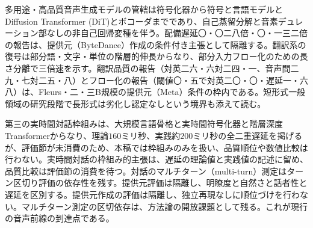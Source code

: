 \documentclass[lualatex,a4paper,10pt]{jlreq}
\begin{document}
多用途・高品質音声生成モデルの管轄は符号化器から符号と言語モデルとDiffusion Transformer (DiT)とボコーダまでであり、自己蒸留分解と音素デュレーション部なしの非自己回帰変種を伴う\autocite{btd061}。配備遅延〇・〇二八倍・〇・一三二倍の報告は、提供元（ByteDance）作成の条件付き主張として隔離する\autocite{btd061}。翻訳系の復号は部分語・文字・単位の階層的伸長からなり、部分入力フロー化のための長さ分離で三倍速を示す\autocite{btd062}。翻訳品質の報告（対英二六・六対二四・一、音声間二九・七対二五・八）とフロー化の報告（閾値〇・五で対英二〇・〇・遅延一・六八）は、Fleurs・二・三B規模の提供元（Meta）条件の枠内である\autocite{btd062}。短形式一般領域の研究段階で長形式は劣化し認定なしという境界も添えて読む\autocite{btd062}。

第三の実時間対話枠組みは、大規模言語骨格と実時間符号化器と階層深度Transformerからなり、理論$160$ミリ秒、実践約$200$ミリ秒の全二重遅延を掲げるが、評価節が未消費のため、本稿では枠組みのみを扱い、品質順位や数値比較は行わない\autocite{btd134}。実時間対話の枠組み的主張は、遅延の理論値と実践値の記述に留め、品質比較は評価節の消費を待つ\autocite{btd134}。対話のマルチターン（multi-turn）測定はターン区切り評価の依存性を残す\autocite{btd134}。提供元評価は隔離し、明瞭度と自然さと話者性と遅延を区別する\autocite{btd061,btd062,btd134}。提供元作成の評価は隔離し、独立再現なしに順位づけを行わない\autocite{btd061}。マルチターン測定の区切依存は、方法論の開放課題として残る\autocite{btd134}。これが現行の音声前線の到達点である\autocite{btd061,btd062,btd134}。
\end{document}
